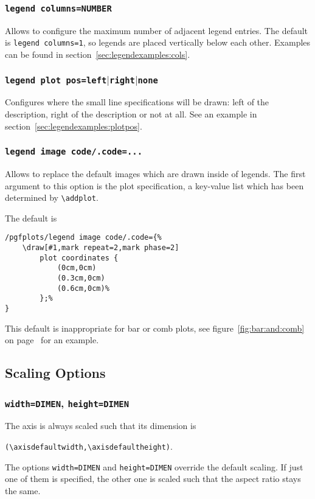 \subsubsection{\texttt{legend columns=NUMBER}}
Allows to configure the maximum number of adjacent legend entries. The default is \texttt{legend columns=1}, so legends are placed vertically below each other. Examples can be found in section~\ref{sec:legendexamples:cols}.

\subsubsection{\texttt{legend plot pos=left$|$right$|$none}}
Configures where the small line specifications will be drawn: left of the description, right of the description or not at all. See an example in section~\ref{sec:legendexamples:plotpos}.

\subsubsection{\texttt{legend image code/.code={...}}}
\label{opt:legend:image:code}
Allows to replace the default images which are drawn inside of legends. The first argument to this option is the plot specification, a key-value list which has been determined by \lstinline!\addplot!.

The default is
\begin{lstlisting}
/pgfplots/legend image code/.code={%
	\draw[#1,mark repeat=2,mark phase=2] 
		plot coordinates {
			(0cm,0cm) 
			(0.3cm,0cm)
			(0.6cm,0cm)%
		};%
}
\end{lstlisting}
This default is inappropriate for bar or comb plots, see figure~\ref{fig:bar:and:comb} on page~\pageref{fig:bar:and:comb} for an example.


\subsection{Scaling Options}

\subsubsection{\texttt{width=DIMEN}, \texttt{height=DIMEN}}
The axis is always scaled such that its dimension is 

{\centering\lstinline!(\axisdefaultwidth,\axisdefaultheight)!.

}%
\noindent
The options \lstinline!width=DIMEN! and \lstinline!height=DIMEN! override the default scaling. If just one of them is specified, the other one is scaled such that the aspect ratio stays the same.

